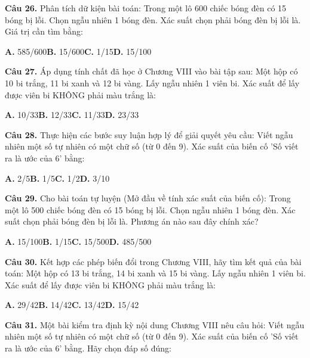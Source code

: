\documentclass[11pt,a4paper]{article}
\begin{document}
\textbf{\color{primary} Câu 26.} Phân tích dữ kiện bài toán: Trong một lô 600 chiếc bóng đèn có 15 bóng bị lỗi. Chọn ngẫu nhiên 1 bóng đèn. Xác suất chọn phải bóng đèn bị lỗi là. Giá trị cần tìm bằng:\par
\hspace*{1.5em}\textbf{A.} 585/600\quad\quad \textbf{B.} 15/600\quad\quad \textbf{C.} 1/15\quad\quad \textbf{D.} 15/100\par\vspace{2pt}
\textbf{\color{primary} Câu 27.} Áp dụng tính chất đã học ở Chương VIII vào bài tập sau: Một hộp có 10 bi trắng, 11 bi xanh và 12 bi vàng. Lấy ngẫu nhiên 1 viên bi. Xác suất để lấy được viên bi KHÔNG phải màu trắng là:\par
\hspace*{1.5em}\textbf{A.} 10/33\quad\quad \textbf{B.} 12/33\quad\quad \textbf{C.} 11/33\quad\quad \textbf{D.} 23/33\par\vspace{2pt}
\textbf{\color{primary} Câu 28.} Thực hiện các bước suy luận hợp lý để giải quyết yêu cầu: Viết ngẫu nhiên một số tự nhiên có một chữ số (từ 0 đến 9). Xác suất của biến cố 'Số viết ra là ước của 6' bằng:\par
\hspace*{1.5em}\textbf{A.} 2/5\quad\quad \textbf{B.} 1/5\quad\quad \textbf{C.} 1/2\quad\quad \textbf{D.} 3/10\par\vspace{2pt}
\textbf{\color{primary} Câu 29.} Cho bài toán tự luyện (Mở đầu về tính xác suất của biến cố): Trong một lô 500 chiếc bóng đèn có 15 bóng bị lỗi. Chọn ngẫu nhiên 1 bóng đèn. Xác suất chọn phải bóng đèn bị lỗi là. Phương án nào sau đây chính xác?\par
\hspace*{1.5em}\textbf{A.} 15/100\quad\quad \textbf{B.} 1/15\quad\quad \textbf{C.} 15/500\quad\quad \textbf{D.} 485/500\par\vspace{2pt}
\textbf{\color{primary} Câu 30.} Kết hợp các phép biến đổi trong Chương VIII, hãy tìm kết quả của bài toán: Một hộp có 13 bi trắng, 14 bi xanh và 15 bi vàng. Lấy ngẫu nhiên 1 viên bi. Xác suất để lấy được viên bi KHÔNG phải màu trắng là:\par
\hspace*{1.5em}\textbf{A.} 29/42\quad\quad \textbf{B.} 14/42\quad\quad \textbf{C.} 13/42\quad\quad \textbf{D.} 15/42\par\vspace{2pt}
\textbf{\color{primary} Câu 31.} Một bài kiểm tra định kỳ nội dung Chương VIII nêu câu hỏi: Viết ngẫu nhiên một số tự nhiên có một chữ số (từ 0 đến 9). Xác suất của biến cố 'Số viết ra là ước của 6' bằng. Hãy chọn đáp số đúng:\par
\end{document}
